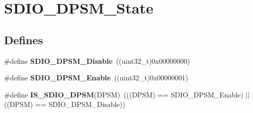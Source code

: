\hypertarget{group__SDIO__DPSM__State}{
\section{SDIO\_\-DPSM\_\-State}
\label{group__SDIO__DPSM__State}
}
\subsection*{Defines}
\begin{DoxyCompactItemize}
\item 
\hypertarget{group__SDIO__DPSM__State_ga156a9f6ab87a46dcb99ddd7462ca064b}{
\#define {\bfseries SDIO\_\-DPSM\_\-Disable}~((uint32\_\-t)0x00000000)}
\label{group__SDIO__DPSM__State_ga156a9f6ab87a46dcb99ddd7462ca064b}

\item 
\hypertarget{group__SDIO__DPSM__State_ga22bc12465c1cf839145619a859276c37}{
\#define {\bfseries SDIO\_\-DPSM\_\-Enable}~((uint32\_\-t)0x00000001)}
\label{group__SDIO__DPSM__State_ga22bc12465c1cf839145619a859276c37}

\item 
\hypertarget{group__SDIO__DPSM__State_gac87a2d7a8fc417a4514d733be50e6d63}{
\#define {\bfseries IS\_\-SDIO\_\-DPSM}(DPSM)~(((DPSM) == SDIO\_\-DPSM\_\-Enable) $|$$|$ ((DPSM) == SDIO\_\-DPSM\_\-Disable))}
\label{group__SDIO__DPSM__State_gac87a2d7a8fc417a4514d733be50e6d63}

\end{DoxyCompactItemize}

